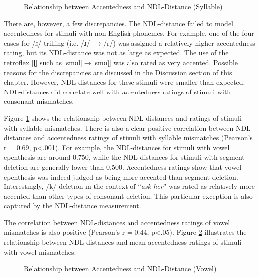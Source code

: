 \begin{figure}[!h]
  \figSpace
    \centering
    
    \caption{Relationship between Accentedness and NDL-Distance (Syllable)}
    \label{fig:syl}
  \figSpace
\end{figure}

There are, however, a few discrepancies. The NDL-distance failed to model accentedness for stimuli with non-English phonemes. For example, one of the four cases for /ɹ/-trilling (i.e. /ɹ/ $\rightarrow$/r/) was assigned a relatively higher accentedness rating, but its NDL-distance was not as large as expected. The use of the retroflex [ɭ] such as [smɑl]$\rightarrow$[smɑɭ] was also rated as very accented. Possible reasons for the discrepancies are discussed in the Discussion section of this chapter. However, NDL-distances for these stimuli were smaller than expected. NDL-distances did correlate well with accentedness ratings of stimuli with consonant mismatches. 

Figure \ref{fig:syl} shows the relationship between NDL-distances and ratings of stimuli with syllable mismatches. There is also a clear positive correlation between NDL-distances and accentedness ratings of stimuli with syllable mismatches (Pearson’s r = 0.69, p<.001). For example, the NDL-distances for stimuli with vowel epenthesis are around 0.750, while the NDL-distances for stimuli with segment deletion are generally lower than 0.500. Accentedness ratings show that vowel epenthesis was indeed judged as being more accented than segment deletion. Interestingly, /k/-deletion in the context of “\textit{ask her}” was rated as relatively more accented than other types of consonant deletion. This particular exception is also captured by the NDL-distance measurement. 

The correlation between NDL-distances and accentedness ratings of vowel mismatches is also positive (Pearson’s r = 0.44, p<.05). Figure \ref{fig:vow} illustrates the relationship between NDL-distances and mean accentedness ratings of stimuli with vowel mismatches. 

\begin{figure}[!h]
  \figSpace
    \centering
        
    \caption{Relationship between Accentedness and NDL-Distance (Vowel)}
    \label{fig:vow}
  \figSpace
\end{figure}


